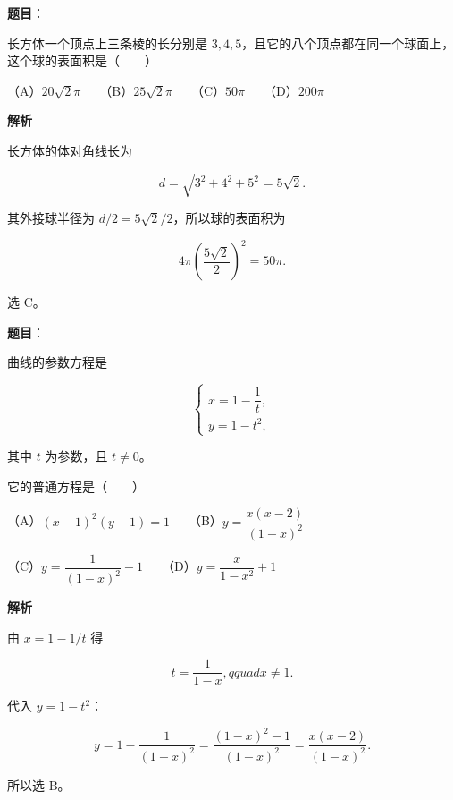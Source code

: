 \begin{answer}

\textbf{题目}：

长方体一个顶点上三条棱的长分别是 $3,4,5$，且它的八个顶点都在同一个球面上，这个球的表面积是\mbox{（　　）}

（A）$20\sqrt2\pi$　　（B）$25\sqrt2\pi$　　（C）$50\pi$　　（D）$200\pi$

\textbf{解析}

长方体的体对角线长为

\nopagebreak[4]
\[
d=\sqrt{3^2+4^2+5^2}=5\sqrt2.
\]

其外接球半径为 $d/2=5\sqrt2/2$，所以球的表面积为

\nopagebreak[4]
\[
4\pi\left(\frac{5\sqrt2}{2}\right)^2=50\pi.
\]

选 C。


\end{answer}
\begin{answer}

\textbf{题目}：

曲线的参数方程是

\nopagebreak[4]
\[
\begin{cases}
x=1-\dfrac1t,\\
y=1-t^2,
\end{cases}
\]

其中 $t$ 为参数，且 $t\neq0$。

它的普通方程是\mbox{（　　）}

（A）$(x-1)^2(y-1)=1$　　（B）$y=\dfrac{x(x-2)}{(1-x)^2}$

（C）$y=\dfrac1{(1-x)^2}-1$　　（D）$y=\dfrac{x}{1-x^2}+1$

\textbf{解析}

由 $x=1-1/t$ 得

\nopagebreak[4]
\[
t=\frac1{1-x},qquad x\ne1.
\]

代入 $y=1-t^2$：

\nopagebreak[4]
\[
y=1-\frac1{(1-x)^2}
=\frac{(1-x)^2-1}{(1-x)^2}
=\frac{x(x-2)}{(1-x)^2}.
\]

所以选 B。


\end{answer}
